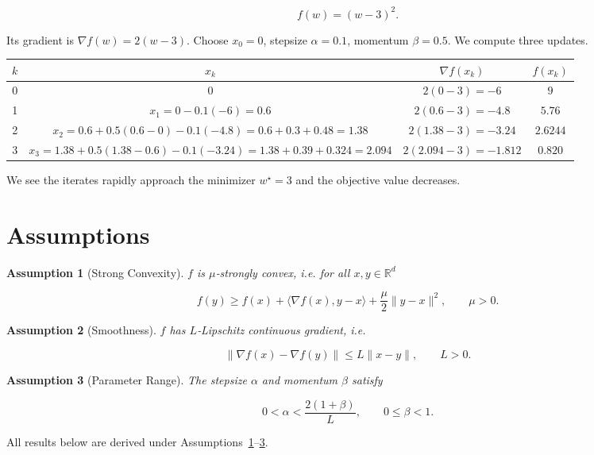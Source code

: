 \documentclass{article}
\newtheorem{assumption}{Assumption}
\begin{document}
\[
f(w) = (w-3)^2 .
\]

Its gradient is $\nabla f(w)=2(w-3)$.  
Choose $x_0=0$, stepsize $\alpha=0.1$, momentum $\beta=0.5$.
We compute three updates.

\begin{center}
\begin{tabular}{c|c|c|c}
$k$ & $x_k$ & $\nabla f(x_k)$ & $f(x_k)$ \\ \hline
0 & $0$ & $2(0-3)=-6$ & $9$ \\[1mm]
1 & $x_1 = 0 -0.1(-6)=0.6$ & $2(0.6-3)=-4.8$ & $5.76$ \\[1mm]
2 & $x_2 = 0.6 +0.5(0.6-0) -0.1(-4.8)=0.6+0.3+0.48=1.38$ &
$2(1.38-3)=-3.24$ & $2.6244$ \\[1mm]
3 & $x_3 = 1.38 +0.5(1.38-0.6) -0.1(-3.24)=1.38+0.39+0.324=2.094$ &
$2(2.094-3)=-1.812$ & $0.820$ \\ 
\end{tabular}
\end{center}

We see the iterates rapidly approach the minimizer $w^\star=3$ and the
objective value decreases.

\section*{Assumptions}
\begin{assumption}[Strong Convexity]\label{as:sc}
$f$ is $\mu$‑strongly convex, i.e. for all $x,y\in\mathbb{R}^d$  

\[
f(y)\ge f(x)+\langle \nabla f(x),y-x\rangle+\frac{\mu}{2}\|y-x\|^2,
\qquad\mu>0 .
\]
\end{assumption}

\begin{assumption}[Smoothness]\label{as:smooth}
$f$ has $L$‑Lipschitz continuous gradient, i.e.  

\[
\|\nabla f(x)-\nabla f(y)\|\le L\|x-y\|,\qquad L>0 .
\]
\end{assumption}

\begin{assumption}[Parameter Range]\label{as:param}
The stepsize $\alpha$ and momentum $\beta$ satisfy  

\[
0<\alpha<\frac{2(1+\beta)}{L},\qquad
0\le\beta<1 .
\]
\end{assumption}

All results below are derived under Assumptions~\ref{as:sc}–\ref{as:param}.
\end{document}
